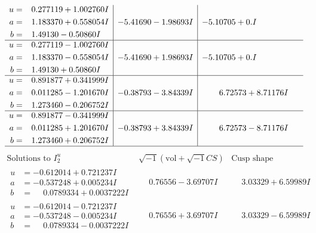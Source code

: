 \documentclass[1p]{elsarticle_modified}
\theoremstyle{definition}
\newcommand{\I}{\sqrt{-1}}
\begin{document}
$$\begin{array}{c|c|c}
\begin{aligned}
u &= \phantom{-}0.277119 + 1.002760 I \\
a &= \phantom{-}1.183370 + 0.558054 I \\
b &= \phantom{-}1.49130 - 0.50860 I\end{aligned}
 & -5.41690 - 1.98693 I & -5.10705 + 0. I\phantom{ +0.000000I} \\ \hline\begin{aligned}
u &= \phantom{-}0.277119 - 1.002760 I \\
a &= \phantom{-}1.183370 - 0.558054 I \\
b &= \phantom{-}1.49130 + 0.50860 I\end{aligned}
 & -5.41690 + 1.98693 I & -5.10705 + 0. I\phantom{ +0.000000I} \\ \hline\begin{aligned}
u &= \phantom{-}0.891877 + 0.341999 I \\
a &= \phantom{-}0.011285 - 1.201670 I \\
b &= \phantom{-}1.273460 - 0.206752 I\end{aligned}
 & -0.38793 - 3.84339 I & \phantom{-}6.72573 + 8.71176 I \\ \hline\begin{aligned}
u &= \phantom{-}0.891877 - 0.341999 I \\
a &= \phantom{-}0.011285 + 1.201670 I \\
b &= \phantom{-}1.273460 + 0.206752 I\end{aligned}
 & -0.38793 + 3.84339 I & \phantom{-}6.72573 - 8.71176 I\\
 \hline 
 \end{array}$$\newpage$$\begin{array}{c|c|c}  
\text{Solutions to }I^u_{2}& \I (\text{vol} + \sqrt{-1}CS) & \text{Cusp shape}\\
 \hline 
\begin{aligned}
u &= -0.612014 + 0.721237 I \\
a &= -0.537248 + 0.005234 I \\
b &= \phantom{-}0.0789334 + 0.0037222 I\end{aligned}
 & \phantom{-}0.76556 - 3.69707 I & \phantom{-}3.03329 + 6.59989 I \\ \hline\begin{aligned}
u &= -0.612014 - 0.721237 I \\
a &= -0.537248 - 0.005234 I \\
b &= \phantom{-}0.0789334 - 0.0037222 I\end{aligned}
 & \phantom{-}0.76556 + 3.69707 I & \phantom{-}3.03329 - 6.59989 I \\ \hline\begin{aligned}

\end{aligned}
\end{array}$$
\end{document}
